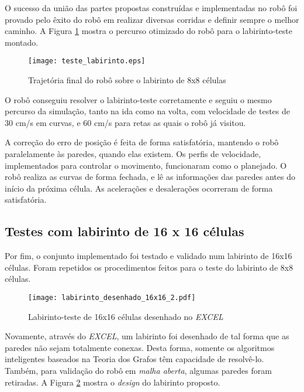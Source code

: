 O sucesso da união das partes propostas construídas e implementadas no robô foi provado pelo êxito do robô em realizar diversas corridas e definir sempre o melhor caminho. A Figura \ref{fig:labteste4} mostra o percurso otimizado do robô para o labirinto-teste montado.
\begin{figure}[!htb]
	\caption{\label{fig:labteste4}Trajetória final do robô sobre o labirinto de 8x8 células}
	\begin{center}
		\texttt{[image: teste\_labirinto.eps]}
	\end{center}
\end{figure}

O robô conseguiu resolver o labirinto-teste corretamente e seguiu o mesmo percurso da simulação, tanto na ida como na volta, com velocidade de testes de 30 cm/s em curvas, e 60 cm/s para retas as quais o robô já visitou. 

A correção do erro de posição é feita de forma satisfatória, mantendo o robô paralelamente às paredes, quando elas existem. Os perfis de velocidade, implementados para controlar o movimento, funcionaram como o planejado. O robô realiza as curvas de forma fechada, e lê as informações das paredes antes do início da próxima célula. As acelerações e desalerações ocorreram de forma satisfatória. 


\subsection{Testes com labirinto de 16 x 16 células}


Por fim, o conjunto implementado foi testado e validado num labirinto de 16x16 células. Foram repetidos os procedimentos feitos para o teste do labirinto de 8x8 células.

 
\begin{figure}[!htb]
	\caption{\label{fig:labteste5}Labirinto-teste de 16x16 células desenhado no \textit{EXCEL}}
	\begin{center}
		\texttt{[image: labirinto\_desenhado\_16x16\_2.pdf]}
	\end{center}
\end{figure}

Novamente, através do \emph{EXCEL}, um labirinto foi desenhado de tal forma que as paredes não sejam totalmente conexas. Desta forma, somente os algoritmos inteligentes baseados na Teoria dos Grafos têm capacidade de resolvê-lo. Também, para validação do robô em \emph{malha aberta}, algumas paredes foram retiradas. A Figura \ref{fig:labteste5} mostra o \emph{design} do labirinto proposto.


